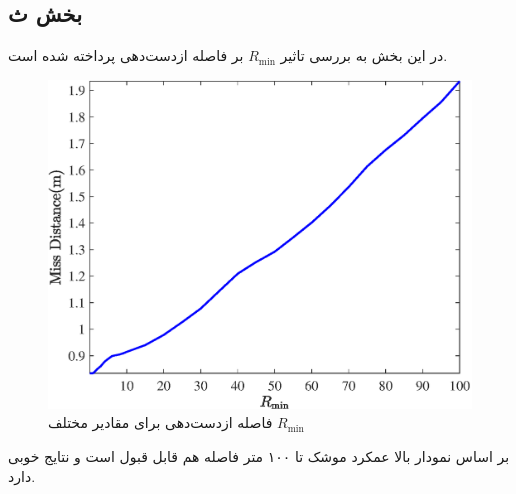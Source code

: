 \subsection{بخش ث}
در این بخش به بررسی تاثیر $R_{\min}$ بر فاصله‌ ازدست‌دهی پرداخته شده است.

\begin{figure}[H]
	\centering
	\includegraphics[width=.75\linewidth]{../Figure/Q1/e/MD}
	\caption{فاصله ازدست‌دهی برای مقادیر مختلف
	$R_{\min}$}
\end{figure}

بر اساس نمودار بالا عمکرد موشک تا ۱۰۰ متر فاصله هم قابل قبول است و نتایج خوبی دارد.